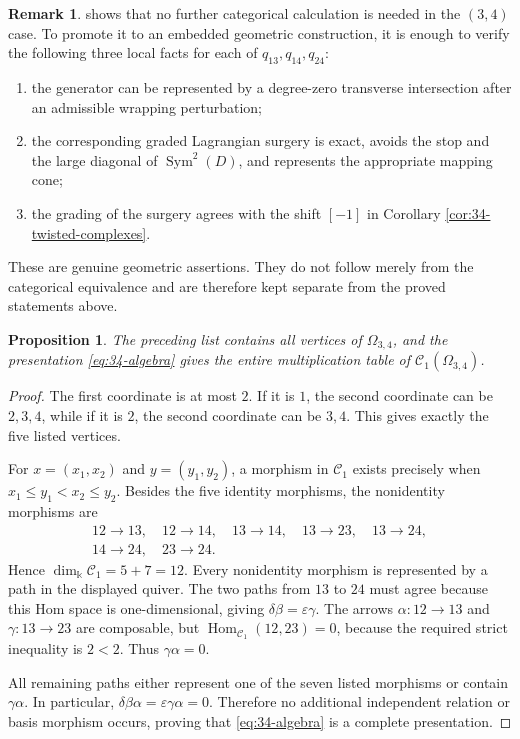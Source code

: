\documentclass[12pt,a4paper,english,reqno]{amsart}
\theoremstyle{plain}
\newtheorem{proposition}[theorem]{Proposition}
\theoremstyle{definition}
\newtheorem{remark}[theorem]{Remark}
\newcommand{\kk}{\Bbbk}
\newcommand{\Hom}{\operatorname{Hom}}
\newcommand{\C}{\mathcal C}
\begin{document}
\begin{remark}
\label{rem:34-surgery-checks}
 shows that no further categorical
calculation is needed in the $(3,4)$ case.  To promote it to an embedded
geometric construction, it is enough to verify the following three local
facts for each of $q_{13},q_{14},q_{24}$:
\begin{enumerate}
\item the generator can be represented by a degree-zero transverse
intersection after an admissible wrapping perturbation;
\item the corresponding graded Lagrangian surgery is exact, avoids the
stop and the large diagonal of $\operatorname{Sym}^2(D)$, and represents
the appropriate mapping cone;
\item the grading of the surgery agrees with the shift $[-1]$ in
Corollary \ref{cor:34-twisted-complexes}.
\end{enumerate}
These are genuine geometric assertions.  They do not follow merely from
the categorical equivalence and are therefore kept separate from the
proved statements above.
\end{remark}

\begin{proposition}
\label{prop:34-full-check}
The preceding list contains all vertices of $\Omega_{3,4}$, and the
presentation \eqref{eq:34-algebra} gives the entire multiplication table of
$\C_1(\Omega_{3,4})$.
\end{proposition}

\begin{proof}
The first coordinate is at most $2$.  If it is $1$, the second
coordinate can be $2,3,4$, while if it is $2$, the second coordinate can
be $3,4$.  This gives exactly the five listed vertices.

For $x=(x_1,x_2)$ and $y=(y_1,y_2)$, a morphism in $\C_1$ exists
precisely when $x_1\leq y_1<x_2\leq y_2$.
Besides the five identity morphisms, the nonidentity morphisms are
\[
\begin{gathered}
12\to13,\quad 12\to14,\quad
13\to14,\quad13\to23,\quad13\to24,\\
14\to24,\quad23\to24.
\end{gathered}
\]
Hence $\dim_{\kk}\C_1=5+7=12$.  Every nonidentity morphism is
represented by a path in the displayed quiver.  The two paths from $13$
to $24$ must agree because this Hom space is one-dimensional, giving
$\delta\beta=\varepsilon\gamma$.  The arrows
$\alpha\colon12\to13$ and $\gamma\colon13\to23$ are composable, but
$\Hom_{\C_1}(12,23)=0$, because the required strict inequality is
$2<2$.  Thus $\gamma\alpha=0$.

All remaining paths either represent one of the seven listed morphisms or
contain $\gamma\alpha$.  In particular,
$\delta\beta\alpha=\varepsilon\gamma\alpha=0$.  Therefore no additional
independent relation or basis morphism occurs, proving that
\eqref{eq:34-algebra} is a complete presentation.
\end{proof}
\end{document}
